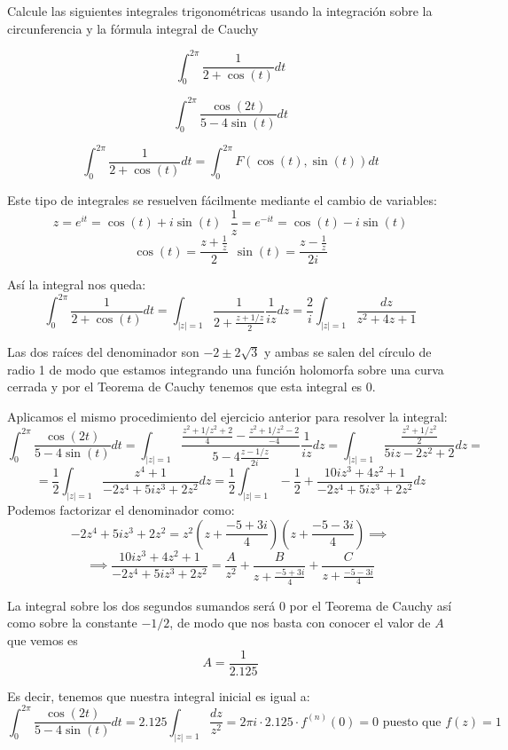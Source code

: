 \begin{problem}[11]
Calcule las siguientes integrales trigonométricas usando la integración sobre la circunferencia y la fórmula integral de Cauchy

\ppart
\[\int_0^{2π}\frac{1}{2+\cos(t)}dt\]

\ppart
\[\int_0^{2π}\frac{\cos(2t)}{5-4\sin(t)}dt\]
\solution

\spart
\[\int_0^{2π}\frac{1}{2+\cos(t)}dt = \int_0^{2π}F(\cos(t),\sin(t))dt\]

Este tipo de integrales se resuelven fácilmente mediante el cambio de variables:
\[z= e^{it}=\cos(t)+i\sin(t) \ \ \ \frac{1}{z}=e^{-it}=\cos(t)-i\sin(t)\]
\[\cos(t)=\frac{z+\frac{1}{z}}{2} \ \ \sin(t)=\frac{z-\frac{1}{z}}{2i}\]

Así la integral nos queda:
\[\int_0^{2π}\frac{1}{2+\cos(t)}dt = \int_{|z|=1}\frac{1}{2+\frac{z+1/z}{2}}\frac{1}{iz}dz = \frac{2}{i}\int_{|z|=1}\frac{dz}{z^2+4z+1}\]

Las dos raíces del denominador son $-2\pm 2\sqrt{3}$ y ambas se salen del círculo de radio 1 de modo que estamos integrando una función holomorfa sobre una curva cerrada y por el Teorema de Cauchy tenemos que esta integral es 0.

\spart

Aplicamos el mismo procedimiento del ejercicio anterior para resolver la integral:
\[\int_0^{2π}\frac{\cos(2t)}{5-4\sin(t)}dt = \int_{|z|=1} \frac{\frac{z^2+1/z^2+2}{4}-\frac{z^2+1/z^2-2}{-4}}{5-4\frac{z-1/z}{2i}}\frac{1}{iz}dz = \int_{|z|=1}\frac{\frac{z^2+1/z^2}{2}}{5iz-2z^2+2} dz=\]
\[=\frac{1}{2}\int_{|z|=1}\frac{z^4+1}{-2z^4+5iz^3+2z^2} dz= \frac{1}{2}\int_{|z|=1}-\frac{1}{2}+\frac{10iz^3+4z^2+1}{-2z^4+5iz^3+2z^2}dz\]
Podemos factorizar el denominador como:
\[-2z^4+5iz^3+2z^2 = z^2\left(z+\frac{-5+3i}{4}\right)\left(z+\frac{-5-3i}{4}\right)\implies\]
\[\implies \frac{10iz^3+4z^2+1}{-2z^4+5iz^3+2z^2}=\frac{A}{z^2}+\frac{B}{z+\frac{-5+3i}{4}}+\frac{C}{z+\frac{-5-3i}{4}}\]

La integral sobre los dos segundos sumandos será 0 por el Teorema de Cauchy así como sobre la constante $-1/2$, de modo que nos basta con conocer el valor de $A$ que vemos es
\[A= \frac{1}{2.125}\]

Es decir, tenemos que nuestra integral inicial es igual a:
\[\int_0^{2π}\frac{\cos(2t)}{5-4\sin(t)}dt =  2.125\int_{|z|=1}\frac{dz}{z^2} = 2πi \cdot 2.125 \cdot f^{(n)}(0) = 0 \text{ puesto que } f(z)=1\]
\end{problem}

